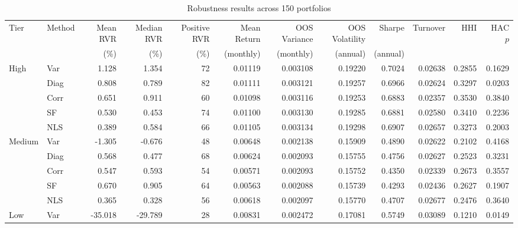 \begin{table}
	\centering
	\caption{Robustness results across 150 portfolios}
	\label{tab:robustness_150}
	\scriptsize
	\setlength{\tabcolsep}{4pt}
	\begin{tabular}{llrrrrrrrrrr}
		\hline
		Tier & Method
		& Mean RVR
		& Median RVR
		& Positive RVR
		& Mean Return
		& OOS Variance
		& OOS Volatility
		& Sharpe
		& Turnover
		& HHI
		& HAC $p$ \\
		&
		& (\%) & (\%) & (\%)
		& (monthly) & (monthly)
		& (annual) & (annual)
		& & & \\
		\hline
		High & Var
		& 1.128 & 1.354 & 72
		& 0.01119 & 0.003108 & 0.19220
		& 0.7024 & 0.02638 & 0.2855 & 0.1629 \\
		
		& Diag
		& 0.808 & 0.789 & 82
		& 0.01111 & 0.003121 & 0.19257
		& 0.6966 & 0.02624 & 0.3297 & 0.0203 \\
		
		& Corr
		& 0.651 & 0.911 & 60
		& 0.01098 & 0.003116 & 0.19253
		& 0.6883 & 0.02357 & 0.3530 & 0.3840 \\
		
		& SF
		& 0.530 & 0.453 & 74
		& 0.01100 & 0.003130 & 0.19285
		& 0.6881 & 0.02580 & 0.3410 & 0.2236 \\
		
		& NLS
		& 0.389 & 0.584 & 66
		& 0.01105 & 0.003134 & 0.19298
		& 0.6907 & 0.02657 & 0.3273 & 0.2003 \\
		\hline
		Medium & Var
		& -1.305 & -0.676 & 48
		& 0.00648 & 0.002138 & 0.15909
		& 0.4890 & 0.02622 & 0.2102 & 0.4168 \\
		
		& Diag
		& 0.568 & 0.477 & 68
		& 0.00624 & 0.002093 & 0.15755
		& 0.4756 & 0.02627 & 0.2523 & 0.3231 \\
		
		& Corr
		& 0.547 & 0.593 & 54
		& 0.00571 & 0.002093 & 0.15752
		& 0.4350 & 0.02339 & 0.2673 & 0.3557 \\
		
		& SF
		& 0.670 & 0.905 & 64
		& 0.00563 & 0.002088 & 0.15739
		& 0.4293 & 0.02436 & 0.2627 & 0.1907 \\
		
		& NLS
		& 0.365 & 0.328 & 56
		& 0.00618 & 0.002097 & 0.15770
		& 0.4707 & 0.02677 & 0.2476 & 0.3640 \\
		\hline
		Low & Var
		& -35.018 & -29.789 & 28
		& 0.00831 & 0.002472 & 0.17081
		& 0.5749 & 0.03089 & 0.1210 & 0.0149 \\
		

\end{tabular}
\end{table}
